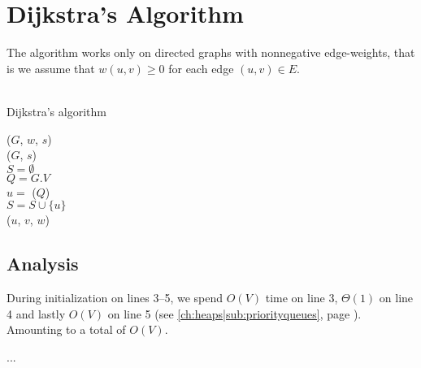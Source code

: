 \section{Dijkstra's Algorithm}
The algorithm works only on directed graphs with nonnegative edge-weights,
that is we assume that $w(u, v) \geq 0$ for each edge $(u, v) \in E$.
\\\\
\begin{algorithm}[H]
	\caption{Dijkstra's algorithm}
	\label{alg:dijkstra}
	
	
	
	
	\BlankLine
	\Dijkstra($G$, $w$, $s$) \\
	\Begin
	{
		\InitSingleSource($G$, $s$) \\
		$S = \emptyset$ \\
		$Q = G.V$ \\
		{
			$u = $ \ExtractMin($Q$) \\
			$S = S \cup \{u\}$ \\
			{
				\Relax($u$, $v$, $w$)
			}
		}
	}
\end{algorithm}

\subsection{Analysis}
During initialization on lines 3--5, we spend $O(V)$ time on line 3,
$\Theta(1)$ on line 4 and lastly $O(V)$ on line 5
(see \ref{ch:heaps|sub:priorityqueues}, page
\pageref{ch:heaps|sub:priorityqueues}). Amounting to a total of $O(V)$.

...

\newpage
